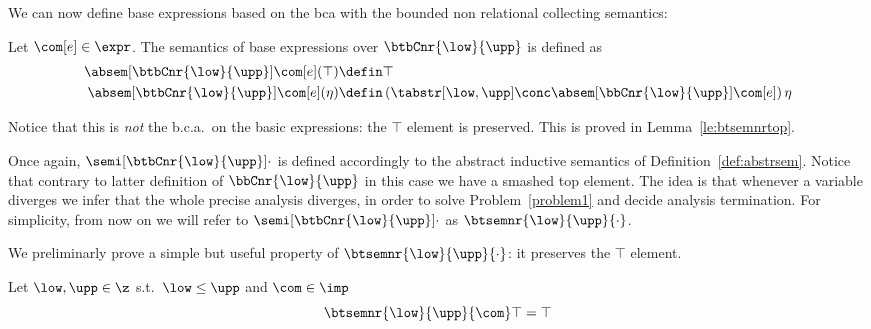 We can now define base expressions based on the bca with the bounded
non relational collecting semantics:

\begin{definition}\label{def:boundedtop}
  Let \(\com[e] \in \expr\). The semantics of base expressions over
  \(\btbCnr{\low}{\upp}\) is defined as
  \begin{align*}
    \absem[\btbCnr{\low}{\upp}]{\com[e]}(\top) \defin & \top \\
    \absem[\btbCnr{\low}{\upp}]{\com[e]}(\eta) \defin & \left({\tabstr[\low,\upp]}\conc \absem[\bbCnr{\low}{\upp}]{\com[e]}\right)\eta
  \end{align*}
\end{definition}
Notice that this is \emph{not} the b.c.a.\ on the basic expressions:
the \(\top\) element is preserved. This is proved in
Lemma~\ref{le:btsemnrtop}.

Once again, \(\semi[\btbCnr{\low}{\upp}]{\cdot}\) is defined accordingly
to the abstract inductive semantics of Definition~\ref{def:abstrsem}.
Notice that contrary to latter definition of \(\bbCnr{\low}{\upp}\) in
this case we have a smashed top element. The idea is that whenever a
variable diverges we infer that the whole precise analysis diverges,
in order to solve Problem~\ref{problem1} and decide analysis
termination.  For simplicity, from now on we will refer to
\(\semi[\btbCnr{\low}{\upp}]{\cdot}\) as \(\btsemnr{\low}{\upp}{\cdot}\).

We preliminarly prove a simple but useful property of
\(\btsemnr{\low}{\upp}{\cdot}\): it preserves the \(\top\) element.

\begin{lemma}\label{le:btsemnrtop}
  Let \(\low, \upp \in \z\) s.t.\ \(\low \leq \upp\) and \(\com\in\imp\)
  \begin{equation*}
    \btsemnr{\low}{\upp}{\com}\top = \top
  \end{equation*}
\end{lemma}

